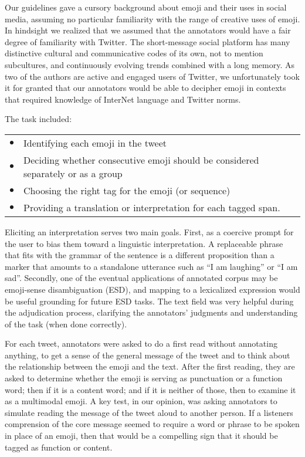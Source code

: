 \documentclass[11pt]{article}
\def\st{$\bullet$}
\begin{document}
Our guidelines gave a cursory background about emoji and their uses in social media, assuming no particular
familiarity with the range of creative uses of emoji. In hindsight we realized that we assumed that the
annotators would have a fair degree of familiarity with Twitter. The short-message social
platform has many distinctive cultural and communicative codes of its own, not to mention subcultures, and
continuously evolving trends combined with a long memory. As two of the authors are active and engaged
users of Twitter, we unfortunately took it for granted that our annotators would be able to decipher emoji
in contexts that required knowledge of InterNet language and Twitter norms.

The task included:
\begin{tabular}{l l}
  \st & Identifying each emoji in the tweet \\
  \st & Deciding whether consecutive emoji should be considered separately or as a group\\
  \st & Choosing the right tag for the emoji (or sequence)\\
  \st & Providing a translation or interpretation for each tagged span.
\end{tabular}

Eliciting an interpretation serves two main goals. First, as a coercive prompt for the user to bias them
toward a linguistic interpretation. A replaceable phrase that fits with the grammar of the sentence is a
different proposition than a marker that amounts to a standalone utterance such as ``I am laughing'' or ``I am sad''.
Secondly, one of the eventual applications of annotated corpus may be emoji-sense disambiguation (ESD), and mapping
to a lexicalized expression would be useful grounding for future ESD tasks. The text field was very helpful
during the adjudication process, clarifying the annotators' judgments and understanding of the task (when
done correctly).

For each tweet, annotators were asked to do a first read without annotating anything, to get a sense of the
general message of the tweet and to think about the relationship between the emoji and the text. After the
first reading, they are asked to determine whether the emoji is serving as punctuation or a function word;
then if it is a content word; and if it is neither of those, then to examine it as a multimodal emoji.
A key test, in our opinion, was asking annotators to simulate reading the message of the tweet aloud to
another person.  If a listeners comprension of the core message seemed to require a word or phrase to be spoken
in place of an emoji, then that would be a compelling sign that it should be tagged as function or content.
\end{document}
